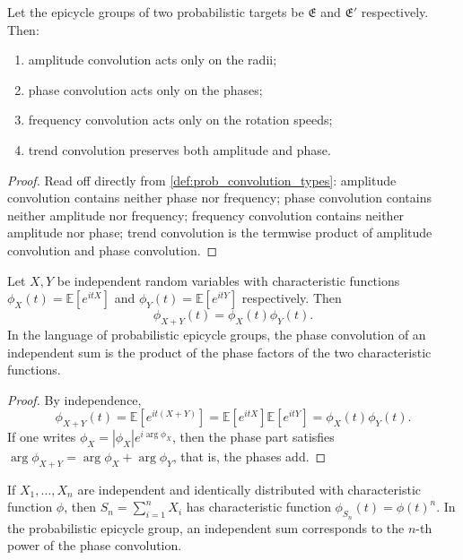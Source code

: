 \begin{theorem}\label{thm:prob_convolution_action}
Let the epicycle groups of two probabilistic targets be $\mathfrak E$ and $\mathfrak E'$ respectively. Then:
\begin{enumerate}[label=(\roman*)]
    \item amplitude convolution acts only on the radii;
    \item phase convolution acts only on the phases;
    \item frequency convolution acts only on the rotation speeds;
    \item trend convolution preserves both amplitude and phase.
\end{enumerate}
\end{theorem}

\begin{proof}
Read off directly from \cref{def:prob_convolution_types}: amplitude convolution contains neither phase nor frequency; phase convolution contains neither amplitude nor frequency; frequency convolution contains neither amplitude nor phase; trend convolution is the termwise product of amplitude convolution and phase convolution.
\end{proof}

\begin{proposition}\label{prop:char_phase_convolution}
Let $X,Y$ be independent random variables with characteristic functions $\phi_X(t)=\mathbb E[e^{itX}]$ and $\phi_Y(t)=\mathbb E[e^{itY}]$ respectively. Then
\[
\phi_{X+Y}(t)=\phi_X(t)\phi_Y(t).
\]
In the language of probabilistic epicycle groups, the phase convolution of an independent sum is the product of the phase factors of the two characteristic functions.
\end{proposition}

\begin{proof}
By independence,
\[
\phi_{X+Y}(t)=\mathbb E[e^{it(X+Y)}]=\mathbb E[e^{itX}]\mathbb E[e^{itY}]=\phi_X(t)\phi_Y(t).
\]
If one writes $\phi_X=|\phi_X|e^{i\arg\phi_X}$, then the phase part satisfies $\arg\phi_{X+Y}=\arg\phi_X+\arg\phi_Y$, that is, the phases add.
\end{proof}

\begin{corollary}\label{cor:indep_sum_conv}
If $X_1,\dots,X_n$ are independent and identically distributed with characteristic function $\phi$, then $S_n=\sum_{i=1}^nX_i$ has characteristic function $\phi_{S_n}(t)=\phi(t)^n$. In the probabilistic epicycle group, an independent sum corresponds to the $n$-th power of the phase convolution.
\end{corollary}

